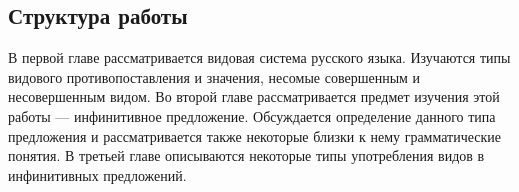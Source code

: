 \subsection*{Структура работы}

В первой главе рассматривается видовая система русского языка. Изучаются типы видового противопоставления и значения, несомые совершенным и несовершенным видом. Во второй главе рассматривается предмет изучения этой работы --- инфинитивное предложение. Обсуждается определение данного типа предложения и рассматривается также некоторые близки к нему грамматические понятия. В третьей главе описываются некоторые типы употребления видов в инфинитивных предложений.